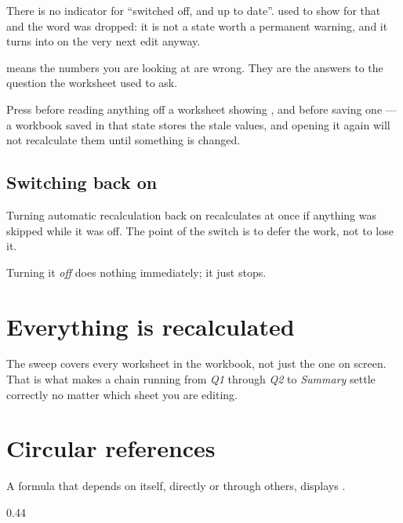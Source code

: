 \begin{ccnote}
There is no indicator for ``switched off, and up to date''. \ccprod{} used to
show  for that and the word was dropped: it is not a state worth a
permanent warning, and it turns into  on the very next edit anyway.
\end{ccnote}

\begin{cccaution}
 means the numbers you are looking at are wrong. They are the answers
to the question the worksheet used to ask.

Press  before reading anything off a worksheet
showing , and before saving one --- a workbook saved in that state
stores the stale values, and opening it again will not recalculate them until
something is changed.
\end{cccaution}

\subsection{Switching back on}

Turning automatic recalculation back on recalculates at once if anything was
skipped while it was off. The point of the switch is to defer the work, not to
lose it.

Turning it \emph{off} does nothing immediately; it just stops.

\section{Everything is recalculated}

The sweep covers every worksheet in the workbook, not just the one on screen.
That is what makes a chain running from \emph{Q1} through \emph{Q2} to
\emph{Summary} settle correctly no matter which sheet you are editing.

\section{Circular references}

A formula that depends on itself, directly or through others, displays
.

\begin{ccexamples}[]{0.44\linewidth}
\end{ccexamples}

